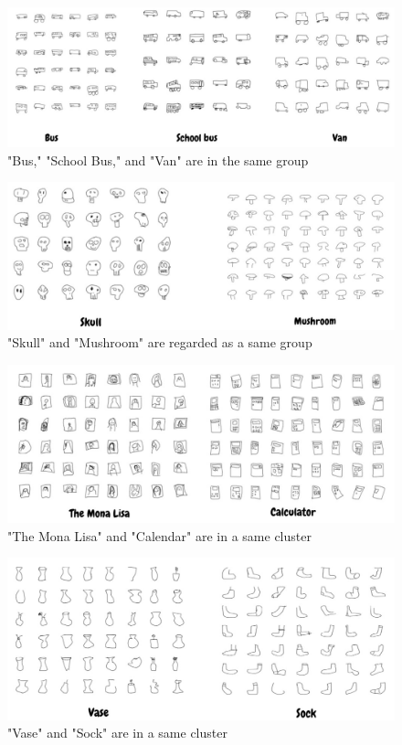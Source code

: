 \begin{figure}[ht]
\begin{center}
   \includegraphics[width=1\linewidth]{figures/3.jpg}
\end{center}
   \caption{"Bus," "School Bus," and "Van" are in the same group}
\label{fig:3}
\end{figure}


\begin{figure}[ht]
\begin{center}
   \includegraphics[width=1\linewidth]{figures/4.jpg}
\end{center}
   \caption{"Skull" and "Mushroom" are regarded as a same group}
\label{fig:4}
\end{figure}


\begin{figure}[ht]
\begin{center}
   \includegraphics[width=1\linewidth]{figures/5.jpg}
\end{center}
   \caption{"The Mona Lisa" and "Calendar" are in a same cluster}
\label{fig:5}
\end{figure}

\begin{figure}[ht]
\begin{center}
   \includegraphics[width=1\linewidth]{figures/6.jpg}
\end{center}
   \caption{"Vase" and "Sock" are in a same cluster}
\label{fig:6}
\end{figure}